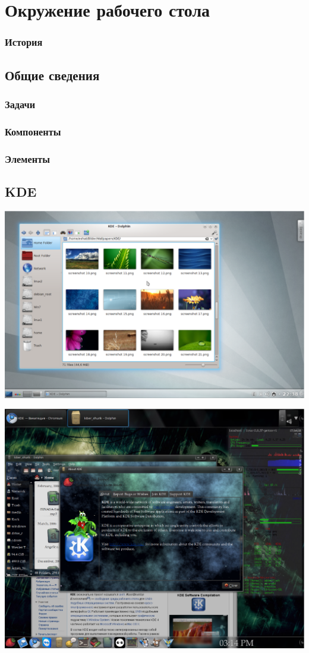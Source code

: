 \section{Окружение рабочего стола}
\subsubsection{История}
\subsection{Общие сведения}
\subsubsection{Задачи}
\subsubsection{Компоненты}
\subsubsection{Элементы}
\subsection{KDE}
\includegraphics[scale=0.38]{Software/KDE1.eps}

\includegraphics[scale=0.38]{Software/KDE2.eps}
